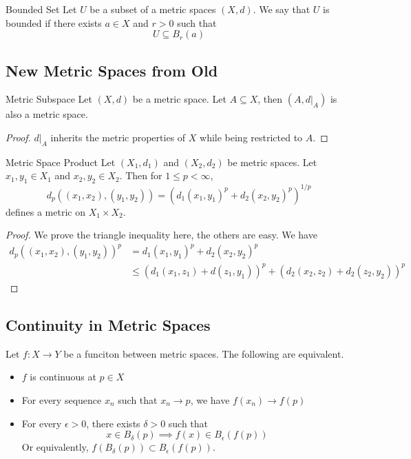 \documentclass[a4paper]{article}
\begin{document}
\begin{defn}{Bounded Set}{} Let $U$ be a subset of a metric spaces $(X,d)$. We say that $U$ is bounded if there exists $a\in X$ and $r>0$ such that $$U\subseteq B_r(a)$$
\end{defn}

\subsection{New Metric Spaces from Old}
\begin{lmm}{Metric Subspace}{} Let $(X,d)$ be a metric space. Let $A\subseteq X$, then $(A,d|_A)$ is also a metric space. \tcbline
\begin{proof}
$d|_A$ inherits the metric properties of $X$ while being restricted to $A$. 
\end{proof}
\end{lmm}

\begin{prp}{Metric Space Product}{} Let $(X_1,d_1)$ and $(X_2,d_2)$ be metric spaces. Let $x_1,y_1\in X_1$ and $x_2,y_2\in X_2$. Then for $1\leq p<\infty$, $$d_p((x_1,x_2),(y_1,y_2))=(d_1(x_1,y_1)^p+d_2(x_2,y_2)^p)^{1/p}$$ defines a metric on $X_1\times X_2$. \tcbline
\begin{proof}
We prove the triangle inequality here, the others are easy. We have
\begin{align*}
d_p((x_1,x_2),(y_1,y_2))^p&=d_1(x_1,y_1)^p+d_2(x_2,y_2)^p\\
&\leq(d_1(x_1,z_1)+d(z_1,y_1))^p+(d_2(x_2,z_2)+d_2(z_2,y_2))^p
\end{align*}
\end{proof}
\end{prp}

\subsection{Continuity in Metric Spaces}
\begin{prp}{}{} Let $f:X\to Y$ be a funciton between metric spaces. The following are equivalent. 
\begin{itemize}
\item $f$ is continuous at $p\in X$
\item For every sequence $x_n$ such that $x_n\to p$, we have $f(x_n)\to f(p)$
\item For every $\epsilon>0$, there exists $\delta>0$ such that $$x\in B_{\delta}(p)\implies f(x)\in B_{\epsilon}(f(p))$$ Or equivalently, $f(B_{\delta}(p))\subset B_{\epsilon}(f(p))$. 
\end{itemize}
\end{prp}
\end{document}
